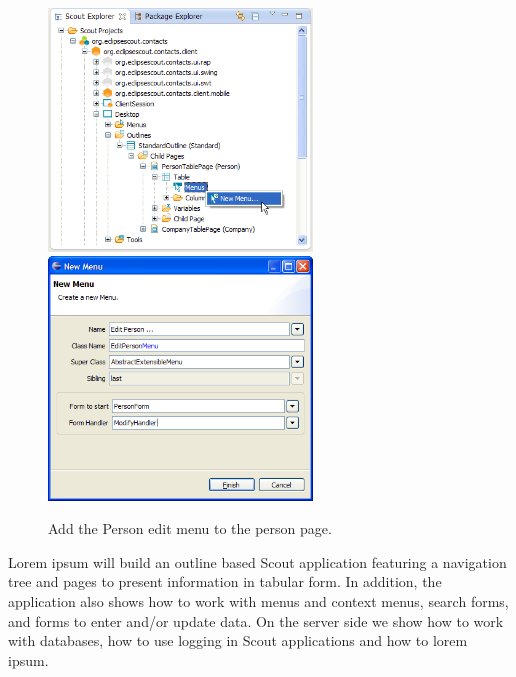 \documentclass[a4paper,10pt,twoside]{book}
\begin{document}
\begin{figure}
\includegraphics[width=7cm]{new_menu_editperson_contextmenu.png} \hspace{5mm}
\includegraphics[width=7cm]{new_menu_editperson.png}
\caption{Add the Person edit menu to the person page.}
\end{figure}

Lorem ipsum will build an outline based Scout application featuring a navigation tree and pages to present information in tabular form. 
In addition, the application also shows how to work with menus and context menus, search forms, and forms to enter and/or update data. 
On the server side we show how to work with databases, how to use logging in Scout applications and how to lorem ipsum. 
\end{document}
